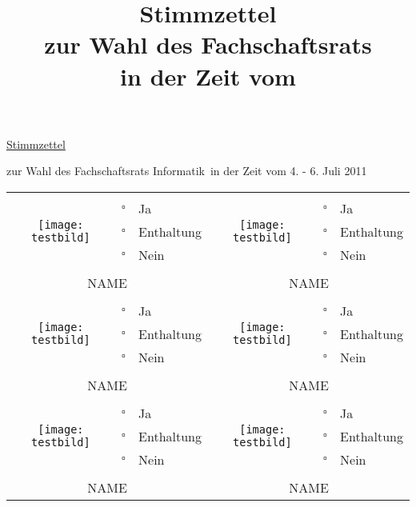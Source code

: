 \documentclass[a4paper,10pt]{scrartcl}
\title{Stimmzettel \\ zur Wahl des Fachschaftsrats \fach \\ in der Zeit vom \zeit}
\date{}
\author{}
\def\fach{Informatik}
\def\zeit{4. - 6. Juli 2011}
\begin{document}
\begin{center}
\Huge \underline{Stimmzettel}
\end{center}
\begin{center}
\large
zur Wahl des Fachschaftsrats \fach ~in der Zeit vom \zeit
\end{center}
\LARGE
\pagestyle{empty}
\thispagestyle{empty}
\begin{center}
\begin{tabularx}{0.95\textwidth}{|clX||clX|}

  \hline
  \multirow{5}{*}{\texttt{[image: testbild]}} &  & & \multirow{5}{*}{\texttt{[image: testbild]}} & & \\
    &  $\square$ & Ja &  &$\square$ & Ja \\
    &  $\square$ & Enthaltung &  &$\square$ & Enthaltung \\
    & $\square$ & Nein\hspace{2cm} & & $\square$ & Nein\\
    &&&&&\\
  \multicolumn{3}{|c||}{NAME} & \multicolumn{3}{|c|}{NAME} \\

  \hline\hline
  
    \multirow{5}{*}{\texttt{[image: testbild]}} &  & & \multirow{5}{*}{\texttt{[image: testbild]}} & & \\
    &  $\square$ & Ja &  &$\square$ & Ja \\
    &  $\square$ & Enthaltung &  &$\square$ & Enthaltung \\
    & $\square$ & Nein\hspace{2cm} & & $\square$ & Nein\\
    &&&&&\\
  \multicolumn{3}{|c||}{NAME} & \multicolumn{3}{|c|}{NAME} \\

  \hline\hline
  
    \multirow{5}{*}{\texttt{[image: testbild]}} &  & & \multirow{5}{*}{\texttt{[image: testbild]}} & & \\
    &  $\square$ & Ja &  &$\square$ & Ja \\
    &  $\square$ & Enthaltung &  &$\square$ & Enthaltung \\
    & $\square$ & Nein\hspace{2cm} & & $\square$ & Nein\\
    &&&&&\\
  \multicolumn{3}{|c||}{NAME} & \multicolumn{3}{|c|}{NAME} \\


\end{tabularx}
\end{center}
\end{document}
